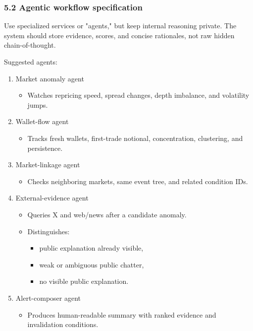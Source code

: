 \documentclass[
]{article}
\providecommand{\tightlist}{%
  \setlength{\itemsep}{0pt}\setlength{\parskip}{0pt}}
\begin{document}
\subsubsection{5.2 Agentic workflow
specification}\label{52-agentic-workflow-specification}

Use specialized services or "agents," but keep internal reasoning
private. The system should store evidence, scores, and concise
rationales, not raw hidden chain-of-thought.

Suggested agents:

\begin{enumerate}
\def\labelenumi{\arabic{enumi}.}
\item
  Market anomaly agent

  \begin{itemize}
  \tightlist
  \item
    Watches repricing speed, spread changes, depth imbalance, and
    volatility jumps.
  \end{itemize}
\item
  Wallet-flow agent

  \begin{itemize}
  \tightlist
  \item
    Tracks fresh wallets, first-trade notional, concentration,
    clustering, and persistence.
  \end{itemize}
\item
  Market-linkage agent

  \begin{itemize}
  \tightlist
  \item
    Checks neighboring markets, same event tree, and related condition
    IDs.
  \end{itemize}
\item
  External-evidence agent

  \begin{itemize}
  \tightlist
  \item
    Queries X and web/news after a candidate anomaly.
  \item
    Distinguishes:

    \begin{itemize}
    \tightlist
    \item
      public explanation already visible,
    \item
      weak or ambiguous public chatter,
    \item
      no visible public explanation.
    \end{itemize}
  \end{itemize}
\item
  Alert-composer agent

  \begin{itemize}
  \tightlist
  \item
    Produces human-readable summary with ranked evidence and
    invalidation conditions.
  \end{itemize}
\end{enumerate}
\end{document}
